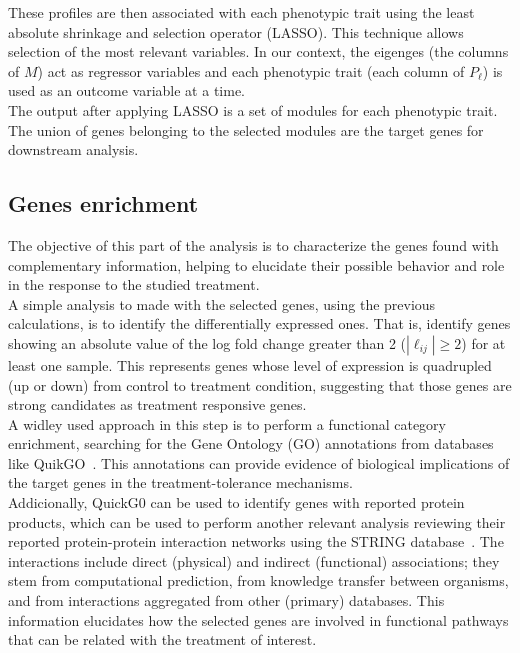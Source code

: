 \documentclass[12pt,journal, onecolumn]{IEEEtran}
\begin{document}

These profiles are then associated with each phenotypic trait using the least absolute shrinkage and selection operator (LASSO).
This technique allows selection of the most relevant variables. In our context, the eigenges (the columns of $M$) act as regressor variables and each phenotypic trait (each column of $P_\ell$) is used as an outcome variable at a time.\\

The output after applying LASSO is a set of modules for each phenotypic trait. The union of genes belonging to the selected modules are the target genes for downstream analysis.\\

\subsection{Genes enrichment}

The objective of this part of the analysis is to characterize the genes found with complementary information, helping to elucidate their possible behavior and role in the response to the studied treatment.\\

A simple analysis to made with the selected genes, using the previous calculations, is to identify the differentially expressed ones. That is, identify genes showing an absolute value of the log fold change greater than 2 ($|\ell_{ij}|\geq 2$) for at least one sample. This represents genes whose level of expression is quadrupled (up or down) from control to treatment condition, suggesting that those genes are strong candidates as treatment responsive genes.\\

A widley used approach in this step is to perform a functional category enrichment, searching for the Gene Ontology (GO) annotations from databases like QuikGO~\cite{binns2009quickgo}. This annotations can provide evidence of biological implications of the target genes in the treatment-tolerance mechanisms.\\

Addicionally, QuickG0 can be used to identify genes with reported protein products, which can be used to perform another relevant analysis reviewing their reported protein-protein interaction networks using the STRING database~\cite{szklarczyk2016string}. The interactions include direct (physical) and indirect (functional) associations; they stem from computational prediction, from knowledge transfer between organisms, and from interactions aggregated from other (primary) databases. This information elucidates how the selected genes are involved in functional pathways that can be related with the treatment of interest.\\
\end{document}
